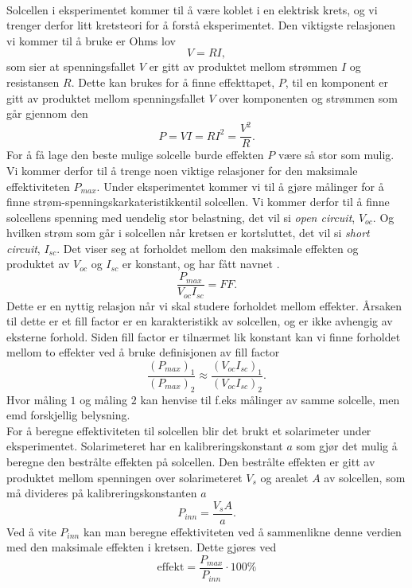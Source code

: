 \documentclass[%
 reprint,
 amsmath,amssymb,
 aps,
 norsk,
 booktabs
]{revtex4-1}
\begin{document}
\\Solcellen i eksperimentet kommer til å være koblet i en elektrisk krets, og vi trenger derfor litt kretsteori for å forstå eksperimentet. Den viktigste relasjonen vi kommer til å bruke er Ohms lov
\begin{equation}
  V = RI,
\end{equation}som sier at spenningsfallet $V$ er gitt av produktet mellom strømmen $I$ og resistansen $R$. Dette kan brukes for å finne effekttapet, $P$, til en komponent er gitt av produktet mellom spenningsfallet $V$ over komponenten og strømmen som går gjennom den
\begin{equation}
  P = VI = RI^2 = \frac{V^2}{R} \label{effekt1}.
\end{equation}For å få lage den beste mulige solcelle burde effekten $P$ være så stor som mulig. Vi kommer derfor til å trenge noen viktige relasjoner for den maksimale effektiviteten $P_{max}$. Under eksperimentet kommer vi til å gjøre målinger for å finne strøm-spenningskarkateristikkentil solcellen. Vi kommer derfor til å finne solcellens spenning med uendelig stor belastning, det vil si \textit{open circuit}, $V_{oc}$. Og hvilken strøm som går i solcellen når kretsen er kortsluttet, det vil si \textit{short circuit}, $I_{sc}$. Det viser seg at forholdet mellom den maksimale effekten og produktet av $V_{oc}$ og $I_{sc}$ er konstant, og har fått navnet .
\begin{equation}
  \frac{P_{max}}{V_{oc}I_{sc}} = FF.
\end{equation}Dette er en nyttig relasjon når vi skal studere forholdet mellom effekter. Årsaken til dette er et fill factor er en karakteristikk av solcellen, og er ikke avhengig av eksterne forhold. Siden fill factor er tilnærmet lik konstant kan vi finne forholdet mellom to effekter ved å bruke definisjonen av fill factor
\begin{equation}
  \frac{\left(P_{max}\right)_1}{\left(P_{max}\right)_2} \approx \frac{\left(V_{oc}I_{sc}\right)_1}{\left(V_{oc}I_{sc}\right)_2}. \label{maxP}
\end{equation}Hvor måling $1$ og måling $2$ kan henvise til f.eks målinger av samme solcelle, men emd forskjellig belysning.\\For å beregne effektiviteten til solcellen blir det brukt et solarimeter under eksperimentet. Solarimeteret har en kalibreringskonstant $a$ som gjør det mulig å beregne den bestrålte effekten på solcellen. Den bestrålte effekten er gitt av produktet mellom spenningen over solarimeteret $V_s$ og arealet $A$ av solcellen, som må divideres på kalibreringskonstanten $a$
\begin{equation}
  P_{inn} = \frac{V_sA}{a} \label{kalibrering}.
\end{equation}
Ved å vite $P_{inn}$ kan man beregne effektiviteten ved å sammenlikne denne verdien med den maksimale effekten i kretsen. Dette gjøres ved
\begin{equation}
  \text{effekt} = \frac{P_{max}}{P_{inn}}\cdot 100\%\label{effekt}
\end{equation}
\end{document}
